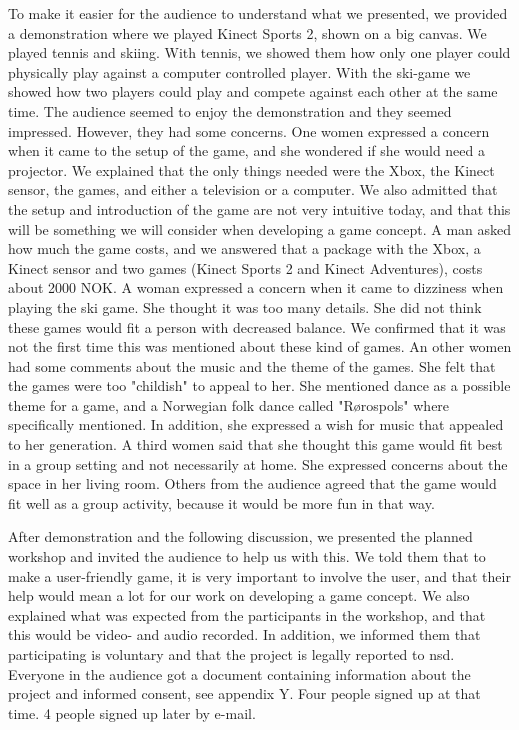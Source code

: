 To make it easier for the audience to understand what we presented, we provided a demonstration where we played Kinect Sports 2, shown on a big canvas. We played tennis and skiing. With tennis, we showed them how only one player could physically play against a computer controlled player. With the ski-game we showed how two players could play and compete against each other at the same time. The audience seemed to enjoy the demonstration and they seemed impressed. However, they had some concerns. One women expressed a concern when it came to the setup of the game, and she wondered if she would need a projector. We explained that the only things needed were the Xbox, the Kinect sensor, the games, and either a television or a computer. We also admitted that the setup and introduction of the game are not very intuitive today, and that this will be something we will consider when developing a game concept. A man asked how much the game costs, and we answered that a package with the Xbox, a Kinect sensor and two games (Kinect Sports 2 and Kinect Adventures), costs about 2000 NOK. A woman expressed a concern when it came to dizziness when playing the ski game. She thought it was too many details. She did not think these games would fit a person with decreased balance. We confirmed that it was not the first time this was mentioned about these kind of games. An other women had some comments about the music and the theme of the games. She felt that the games were too "childish" to appeal to her. She mentioned dance as a possible theme for a game, and a Norwegian folk dance called "Rørospols" where specifically mentioned. In addition, she expressed a wish for music that appealed to her generation. A third women said that she thought this game would fit best in a group setting and not necessarily at home. She expressed concerns about the space in her living room. Others from the audience agreed that the game would fit well as a group activity, because it would be more fun in that way.

After demonstration and the following discussion, we presented the planned workshop and invited the audience to help us with this. We told them that to make a user-friendly game, it is very important to involve the user, and that their help would mean a lot for our work on developing a game concept. We also explained what was expected from the participants in the workshop, and that this would be video- and audio recorded. In addition, we informed them that participating is voluntary and that the project is legally reported to \ac{nsd}. Everyone in the audience got a document containing information about the project and informed consent, see appendix Y. Four people signed up at that time. 4 people signed up later by e-mail.

